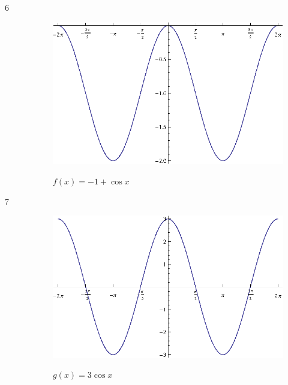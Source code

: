 \documentclass{exam}
\begin{document}
  \begin{description}
    \item[6]
      \begin{figure}[H]
        \centering
        \includegraphics[scale=0.8]{exercise06.eps}

        $f(x) = -1 + \cos x$
      \end{figure}

    \item[7]
      \begin{figure}[H]
        \centering
        \includegraphics[scale=0.8]{exercise07.eps}

        $g(x) = 3 \cos x$
      \end{figure}




\end{description}
\end{document}
